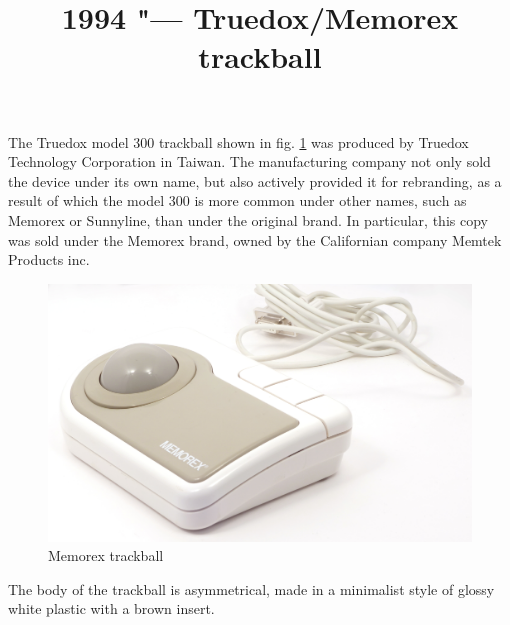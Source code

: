 \documentclass[11pt, a4paper]{article}
\begin{document}
\title{1994 "--- Truedox/Memorex trackball}
\date{}
\maketitle
{}

The Truedox model 300 trackball shown in fig. \ref{fig:MemorexPic} was produced by Truedox Technology Corporation in Taiwan. The manufacturing company not only sold the device under its own name, but also actively provided it for rebranding, as a result of which the model 300 is more common under other names, such as Memorex or Sunnyline, than under the original brand. In particular, this copy was sold under the Memorex brand, owned by the Californian company Memtek Products inc.

\begin{figure}[h]
    \centering
    \includegraphics[scale=0.55]{1994_memorex_trackball/pic_30.jpg}
    \caption{Memorex trackball}
    \label{fig:MemorexPic}
\end{figure}

The body of the trackball is asymmetrical, made in a minimalist style of glossy white plastic with a brown insert.
\end{document}
